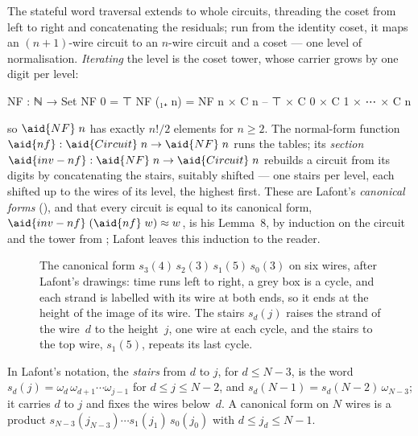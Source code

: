 The stateful word traversal  extends  to whole circuits, threading the coset from left to right and concatenating the residuals; run from the identity coset, it maps an $(n{+}1)$-wire circuit to an $n$-wire circuit and a coset --- one level of normalisation. \emph{Iterating} the level is the coset tower, whose carrier grows by one digit per level:
\begin{code}
NF : ℕ → Set
NF 0      = ⊤
NF (₁₊ n) = NF n × C n   -- ⊤ × C 0 × C 1 × ⋯ × C n
\end{code}
so $\aid{NF}\;n$ has exactly $n!/2$ elements for $n \ge 2$. The normal-form function $\aid{nf} : \aid{Circuit}\;n \to \aid{NF}\;n$ runs the tables; its \emph{section} $\aid{inv-nf} : \aid{NF}\;n \to \aid{Circuit}\;n$ rebuilds a circuit from its digits by concatenating the stairs, suitably shifted --- one stairs per level, each shifted up to the wires of its level, the highest first. These are Lafont's \emph{canonical forms} (), and that every circuit is equal to its canonical form, $\aid{inv-nf}\;(\aid{nf}\;w) \approx w$, is his Lemma~8, by induction on the circuit and the tower from ; Lafont leaves this induction to the reader.

\begin{figure}[!htbp]
\centering
\small

\caption{The canonical form $s_3(4)\,s_2(3)\,s_1(5)\,s_0(3)$ on six wires, after Lafont's drawings: time runs left to right, a grey box is a cycle, and each strand is labelled with its wire at both ends, so it ends at the height of the image of its wire. The stairs $s_d(j)$ raises the strand of the wire~$d$ to the height~$j$, one wire at each cycle, and the stairs to the top wire, $s_1(5)$, repeats its last cycle.}
\label{fig:lafont}
\end{figure}

In Lafont's notation, the \emph{stairs} from $d$ to $j$, for $d\le N-3$, is the word $s_d(j)=\omega_d\,\omega_{d+1}\cdots\omega_{j-1}$ for $d\le j\le N-2$, and $s_d(N-1)=s_d(N-2)\,\omega_{N-3}$; it carries $d$ to $j$ and fixes the wires below~$d$. A canonical form on $N$ wires is a product $s_{N-3}(j_{N-3})\cdots s_1(j_1)\,s_0(j_0)$ with $d\le j_d\le N-1$.

